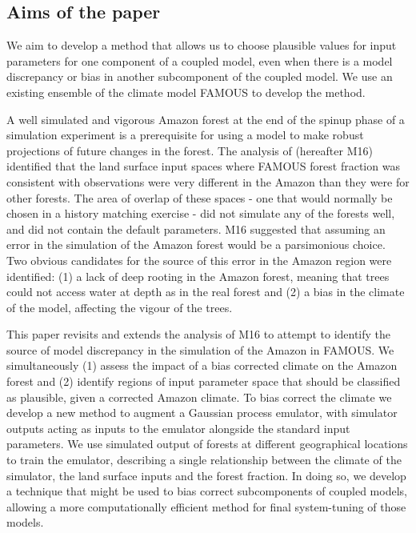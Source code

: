\documentclass[gmd, manuscript]{copernicus}
\begin{document}
\subsection{Aims of the paper}

We aim to develop a method that allows us to choose plausible values for input parameters for one component of a coupled model, even when there is a model discrepancy or bias in another subcomponent of the coupled model. We use an existing ensemble of the climate model FAMOUS to develop the method.

A well simulated and vigorous Amazon forest at the end of the spinup phase of a simulation experiment is a prerequisite for using a model to make robust projections of future changes in the forest. The analysis of \cite{mcneall2016impact} (hereafter M16) identified that the land surface input spaces where FAMOUS forest fraction was consistent with observations were very different in the Amazon than they were for other forests. The area of overlap of these spaces - one that would normally be chosen in a history matching exercise - did not simulate any of the forests well, and did not contain the default parameters. M16 suggested that assuming an error in the simulation of the Amazon forest would be a parsimonious choice. Two obvious candidates for the source of this error in the Amazon region were identified: (1) a lack of deep rooting in the Amazon forest, meaning that trees could not access water at depth as in the real forest and (2) a bias in the climate of the model, affecting the vigour of the trees.

This paper revisits and extends the analysis of M16 to attempt to identify the source of model discrepancy in the simulation of the Amazon in FAMOUS. We simultaneously (1) assess the impact of a bias corrected climate on the Amazon forest and (2) identify regions of input parameter space that should be classified as plausible, given a corrected Amazon climate. To bias correct the climate we develop a new method to augment a Gaussian process emulator, with simulator outputs acting as inputs to the emulator alongside the standard input parameters.  We use simulated output of forests at different geographical locations to train the emulator, describing a single relationship between the climate of the simulator, the land surface inputs and the forest fraction. In doing so, we develop a technique that might be used to bias correct subcomponents of coupled models, allowing a more computationally efficient method for final system-tuning of those models. 
\end{document}
